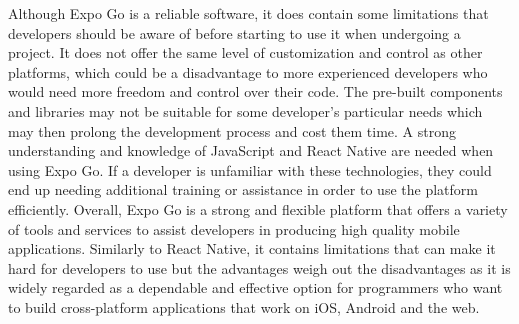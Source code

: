 Although Expo Go is a reliable software, it does contain some limitations that developers should be aware of before starting to use it when undergoing a project. It does not offer the same level of customization and control as other platforms, which could be a disadvantage to more experienced developers who would need more freedom and control over their code. The pre-built components and libraries may not be suitable for some developer’s particular needs which may then prolong the development process and cost them time. A strong understanding and knowledge of JavaScript and React Native are needed when using Expo Go. If a developer is unfamiliar with these technologies, they could end up needing additional training or assistance in order to use the platform efficiently. 
\newline \newline
Overall, Expo Go is a strong and flexible platform that offers a variety of tools and services to assist developers in producing high quality mobile applications. \cite{expoWithRN} Similarly to React Native, it contains limitations that can make it hard for developers to use but the advantages weigh out the disadvantages as it is widely regarded as a dependable and effective option for programmers who want to build cross-platform applications that work on iOS, Android and the web.



